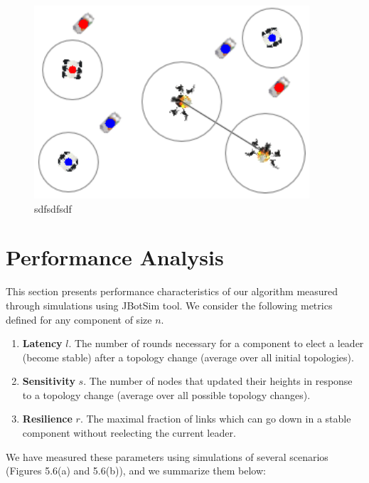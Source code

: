 \begin{figure}
	\centering
	\includegraphics[width=0.7\linewidth]{fig_3}
	\caption[dgfs]{sdfsdfsdf}
	\label{fig:fig3}
\end{figure}



\section{Performance Analysis}

This section presents performance characteristics of our algorithm measured through simulations using JBotSim \cite{31} tool. We consider the following metrics defined for any component of size $n$.

\begin{enumerate}
	\item \textbf{Latency} $l$. The number of rounds necessary for a component to elect a leader (become stable) after a topology change (average over all initial topologies).
	
	\item \textbf{Sensitivity} $s$. The number of nodes that updated their heights in response to a topology change (average over all possible topology changes).
	
	\item \textbf{Resilience} $r$. The maximal fraction of links which can go down in a stable component without reelecting the current leader.
	
\end{enumerate}

We have measured these parameters using simulations of several scenarios (Figures 5.6(a) and 5.6(b)), and we summarize them below:

